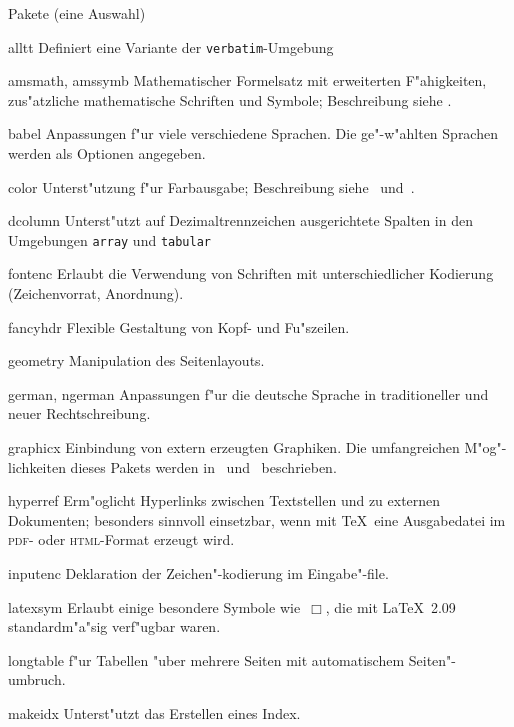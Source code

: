 \begin{table}[htbp]
\caption{Pakete (eine Auswahl)}\label{pack}
\oben{11cm}
\begin{ttdescription}%
\setlength{\itemsep}{.5\itemsep plus1pt minus1pt}
\item[alltt] Definiert eine Variante der \texttt{verbatim}-Umgebung
\item[amsmath, amssymb] Mathematischer Formelsatz mit erweiterten F"ahigkeiten,
  zus"atzliche mathematische Schriften und Symbole; Beschreibung siehe
  \cite{ch8}.
\item[babel] Anpassungen f"ur viele verschiedene Sprachen. Die
  ge"-w"ahlten Sprachen werden als Optionen angegeben.
\item[color] Unterst"utzung f"ur Farbausgabe;
  Beschreibung  siehe~\cite{grfguide} und~\cite{grfcomp}.
\item[dcolumn] Unterst"utzt auf Dezimaltrennzeichen ausgerichtete
  Spalten in den Umgebungen \texttt{array} und \texttt{tabular}
\item[fontenc] Erlaubt die Verwendung von Schriften mit
  unterschiedlicher Kodierung (Zeichenvorrat, Anordnung).
\item[fancyhdr] Flexible Gestaltung von Kopf- und Fu"szeilen.
\item[geometry] Manipulation des Seitenlayouts.
\item[german, ngerman] Anpassungen f"ur die deutsche Sprache in
  traditioneller und neuer Rechtschreibung.
\item[graphicx] Einbindung von extern erzeugten Graphiken.
  Die umfangreichen M"og"-lichkeiten dieses Pakets werden 
  in~\cite{grfguide} und~\cite{grfcomp} beschrieben.
\item[hyperref] Erm"oglicht Hyperlinks zwischen Textstellen und zu
  externen Dokumenten; besonders sinnvoll einsetzbar, 
  wenn mit \TeX\ eine Ausgabedatei im \textsc{pdf}- oder \textsc{html}-Format 
  erzeugt wird.
\item[inputenc] Deklaration der Zeichen"-kodierung im
  Eingabe"-file.
\item[latexsym] Erlaubt einige besondere Symbole wie~\(\Box\),
  die mit \LaTeX~2.09 standardm"a"sig verf"ugbar waren.
\item[longtable]
  f"ur Tabellen "uber mehrere Seiten mit automatischem Seiten"-umbruch.
\item[makeidx] Unterst"utzt das Erstellen eines Index.

\end{ttdescription}
\end{table}
